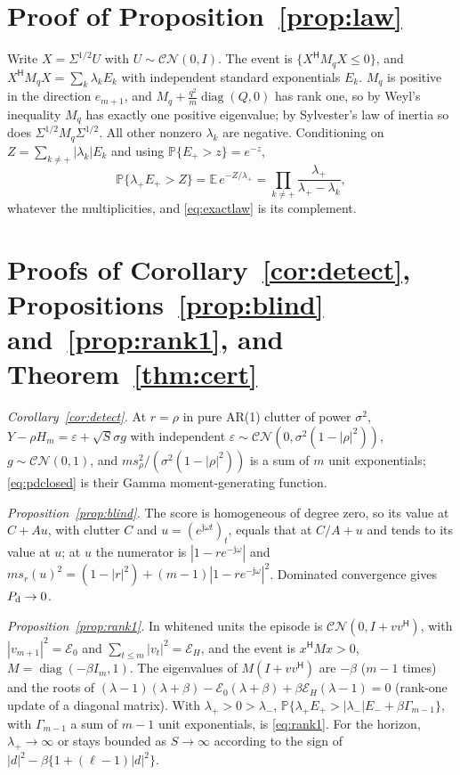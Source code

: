 \documentclass[journal]{IEEEtran}
\newcommand{\PP}{\mathbb{P}}
\begin{document}
\appendices
\section{Proof of Proposition~\ref{prop:law}}\label{app:law}
Write $X=\Sigma^{1/2}U$ with $U\sim\mathcal{CN}(0,I)$. The event is $\{X^{\mathsf H}M_qX\le0\}$, and $X^{\mathsf H}M_qX=\sum_k\lambda_kE_k$ with independent standard exponentials $E_k$. $M_q$ is positive in the direction $e_{m+1}$, and $M_q+\frac{q^2}{m}\operatorname{diag}(Q,0)$ has rank one, so by Weyl's inequality $M_q$ has exactly one positive eigenvalue; by Sylvester's law of inertia so does $\Sigma^{1/2}M_q\Sigma^{1/2}$. All other nonzero $\lambda_k$ are negative. Conditioning on $Z=\sum_{k\ne+}|\lambda_k|E_k$ and using $\PP\{E_+>z\}=e^{-z}$,
\[
\PP\{\lambda_+E_+>Z\}=\mathbb E\,e^{-Z/\lambda_+}=\prod_{k\ne+}\frac{\lambda_+}{\lambda_+-\lambda_k},
\]
whatever the multiplicities, and \eqref{eq:exactlaw} is its complement.

\section{Proofs of Corollary~\ref{cor:detect}, Propositions~\ref{prop:blind} and~\ref{prop:rank1}, and Theorem~\ref{thm:cert}}\label{app:detect}
\emph{Corollary~\ref{cor:detect}.} At $r=\rho$ in pure AR(1) clutter of power $\sigma^2$, $Y-\rho H_m=\varepsilon+\sqrt S\sigma g$ with independent $\varepsilon\sim\mathcal{CN}(0,\sigma^2(1-|\rho|^2))$, $g\sim\mathcal{CN}(0,1)$, and $ms_\rho^2/(\sigma^2(1-|\rho|^2))$ is a sum of $m$ unit exponentials; \eqref{eq:pdclosed} is their Gamma moment-generating function.

\emph{Proposition~\ref{prop:blind}.} The score is homogeneous of degree zero, so its value at $C+Au$, with clutter $C$ and $u=(e^{\mathrm j\omega t})_t$, equals that at $C/A+u$ and tends to its value at $u$; at $u$ the numerator is $|1-re^{-\mathrm j\omega}|$ and $ms_r(u)^2=(1-|r|^2)+(m-1)|1-re^{-\mathrm j\omega}|^2$. Dominated convergence gives $P_{\rm d}\to0$.

\emph{Proposition~\ref{prop:rank1}.} In whitened units the episode is $\mathcal{CN}(0,I+vv^{\mathsf H})$, with $|v_{m+1}|^2=\mathcal E_0$ and $\sum_{t\le m}|v_t|^2=\mathcal E_H$, and the event is $x^{\mathsf H}Mx>0$, $M=\operatorname{diag}(-\beta I_m,1)$. The eigenvalues of $M(I+vv^{\mathsf H})$ are $-\beta$ ($m-1$ times) and the roots of $(\lambda-1)(\lambda+\beta)-\mathcal E_0(\lambda+\beta)+\beta\mathcal E_H(\lambda-1)=0$ (rank-one update of a diagonal matrix). With $\lambda_+>0>\lambda_-$, $\PP\{\lambda_+E_+>|\lambda_-|E_-+\beta\Gamma_{m-1}\}$, with $\Gamma_{m-1}$ a sum of $m-1$ unit exponentials, is \eqref{eq:rank1}. For the horizon, $\lambda_+\to\infty$ or stays bounded as $S\to\infty$ according to the sign of $|d|^2-\beta\{1+(\ell-1)|d|^2\}$.
\end{document}
